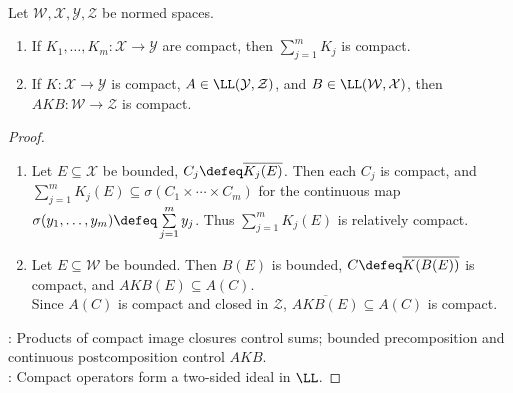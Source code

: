 \begin{proposition} \label{prop:compact-operators-linear-ideal} \\
Let $\mathcal{W},\mathcal{X},\mathcal{Y},\mathcal{Z}$ be normed spaces.
\begin{enumerate}[label=(\roman*)]
\setlength{\itemsep}{0pt}
\item If $K_1,\ldots,K_m:\mathcal{X}\to\mathcal{Y}$ are compact, then $\sum\limits_{j=1}^m K_j$ is compact.
\item If $K:\mathcal{X}\to\mathcal{Y}$ is compact, $A\in\LL(\mathcal{Y},\mathcal{Z})$, and $B\in\LL(\mathcal{W},\mathcal{X})$, then $AKB:\mathcal{W}\to\mathcal{Z}$ is compact.
\end{enumerate}
\begin{proof}
\begin{enumerate}[label=(\roman*)]
\setlength{\itemsep}{0pt}
\item Let $E\subseteq\mathcal{X}$ be bounded, $C_j\defeq\overline{K_j(E)}$. Then each $C_j$ is compact, and $\sum\limits_{j=1}^m K_j(E)\subseteq \sigma(C_1\times\cdots\times C_m)$ for the continuous map $\sigma(y_1,\ldots,y_m)\defeq\sum\limits_{j=1}^m y_j$. Thus $\sum\limits_{j=1}^m K_j(E)$ is relatively compact.
\item Let $E\subseteq\mathcal{W}$ be bounded. Then $B(E)$ is bounded, $C\defeq\overline{K(B(E))}$ is compact, and $AKB(E)\subseteq A(C)$.\\
Since $A(C)$ is compact and closed in $\mathcal{Z}$, $\overline{AKB(E)}\subseteq A(C)$ is compact.
\end{enumerate}
: Products of compact image closures control sums; bounded precomposition and continuous postcomposition control $AKB$.\\
: Compact operators form a two-sided ideal in $\LL$.
\end{proof}
\end{proposition}

